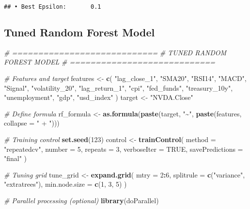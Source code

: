 \documentclass[
]{article}
\newenvironment{Shaded}{\begin{snugshade}}{\end{snugshade}}
\newcommand{\AttributeTok}[1]{\textcolor[rgb]{0.13,0.29,0.53}{#1}}
\newcommand{\CommentTok}[1]{\textcolor[rgb]{0.56,0.35,0.01}{\textit{#1}}}
\newcommand{\ConstantTok}[1]{\textcolor[rgb]{0.56,0.35,0.01}{#1}}
\newcommand{\DecValTok}[1]{\textcolor[rgb]{0.00,0.00,0.81}{#1}}
\newcommand{\FunctionTok}[1]{\textcolor[rgb]{0.13,0.29,0.53}{\textbf{#1}}}
\newcommand{\NormalTok}[1]{#1}
\newcommand{\OtherTok}[1]{\textcolor[rgb]{0.56,0.35,0.01}{#1}}
\newcommand{\SpecialCharTok}[1]{\textcolor[rgb]{0.81,0.36,0.00}{\textbf{#1}}}
\newcommand{\StringTok}[1]{\textcolor[rgb]{0.31,0.60,0.02}{#1}}
\begin{document}
\begin{verbatim}
## • Best Epsilon:       0.1
\end{verbatim}

\subsection{Tuned Random Forest Model}\label{tuned-random-forest-model}

\begin{Shaded}
\begin{Highlighting}[]
\CommentTok{\# ============================}
\CommentTok{\#  TUNED RANDOM FOREST MODEL}
\CommentTok{\# ============================}

\CommentTok{\#  Features and target}
\NormalTok{features }\OtherTok{\textless{}{-}} \FunctionTok{c}\NormalTok{(}
  \StringTok{"lag\_close\_1"}\NormalTok{, }\StringTok{"SMA20"}\NormalTok{, }\StringTok{"RSI14"}\NormalTok{, }\StringTok{"MACD"}\NormalTok{, }\StringTok{"Signal"}\NormalTok{,}
  \StringTok{"volatility\_20"}\NormalTok{, }\StringTok{"lag\_return\_1"}\NormalTok{,}
  \StringTok{"cpi"}\NormalTok{, }\StringTok{"fed\_funds"}\NormalTok{, }\StringTok{"treasury\_10y"}\NormalTok{, }\StringTok{"unemployment"}\NormalTok{,}
  \StringTok{"gdp"}\NormalTok{, }\StringTok{"usd\_index"}
\NormalTok{)}
\NormalTok{target }\OtherTok{\textless{}{-}} \StringTok{"NVDA.Close"}

\CommentTok{\#  Define formula}
\NormalTok{rf\_formula }\OtherTok{\textless{}{-}} \FunctionTok{as.formula}\NormalTok{(}\FunctionTok{paste}\NormalTok{(target, }\StringTok{"\textasciitilde{}"}\NormalTok{, }\FunctionTok{paste}\NormalTok{(features, }\AttributeTok{collapse =} \StringTok{" + "}\NormalTok{)))}

\CommentTok{\#  Training control}
\FunctionTok{set.seed}\NormalTok{(}\DecValTok{123}\NormalTok{)}
\NormalTok{control }\OtherTok{\textless{}{-}} \FunctionTok{trainControl}\NormalTok{(}
  \AttributeTok{method =} \StringTok{"repeatedcv"}\NormalTok{,}
  \AttributeTok{number =} \DecValTok{5}\NormalTok{,}
  \AttributeTok{repeats =} \DecValTok{3}\NormalTok{,}
  \AttributeTok{verboseIter =} \ConstantTok{TRUE}\NormalTok{,}
  \AttributeTok{savePredictions =} \StringTok{"final"}
\NormalTok{)}

\CommentTok{\# Tuning grid}
\NormalTok{tune\_grid }\OtherTok{\textless{}{-}} \FunctionTok{expand.grid}\NormalTok{(}
  \AttributeTok{mtry =} \DecValTok{2}\SpecialCharTok{:}\DecValTok{6}\NormalTok{,}
  \AttributeTok{splitrule =} \FunctionTok{c}\NormalTok{(}\StringTok{"variance"}\NormalTok{, }\StringTok{"extratrees"}\NormalTok{),}
  \AttributeTok{min.node.size =} \FunctionTok{c}\NormalTok{(}\DecValTok{1}\NormalTok{, }\DecValTok{3}\NormalTok{, }\DecValTok{5}\NormalTok{)}
\NormalTok{)}

\CommentTok{\# Parallel processing (optional)}
\FunctionTok{library}\NormalTok{(doParallel)}
\end{Highlighting}
\end{Shaded}
\end{document}
